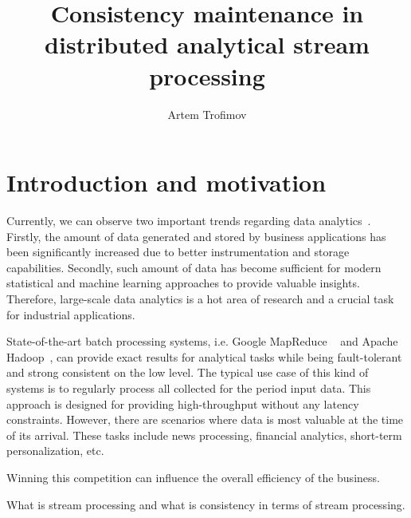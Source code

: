 \documentclass{llncs}
\begin{document}
\title {Consistency maintenance in distributed analytical stream processing}
\author{Artem Trofimov}

\maketitle

\begin{abstract}

\end {abstract}

\section {Introduction and motivation}
Currently, we can observe two important trends regarding data analytics~\cite{Zou:2010:SRQ:1920841.1921012}. Firstly, the amount of data generated and stored by business applications has been significantly increased due to better instrumentation and storage capabilities. Secondly, such amount of data has become sufficient for modern statistical and machine learning approaches to provide valuable insights. Therefore, large-scale data analytics is a hot area of research and a crucial task for industrial applications.

State-of-the-art batch processing systems, i.e. Google MapReduce ~\cite{Dean:2008:MSD:1327452.1327492} and Apache Hadoop~\cite{hadoop2009hadoop}, can provide exact results for analytical tasks while being fault-tolerant and strong consistent on the low level. The typical use case of this kind of systems is to regularly process all collected for the period input data. This approach is designed for providing high-throughput without any latency constraints. However, there are scenarios where data is most valuable at the time of its arrival. These tasks include news processing, financial analytics, short-term personalization, etc.

Winning this competition can influence the overall efficiency of the business. 

What is stream processing and what is consistency in terms of stream processing.
\end{document}
